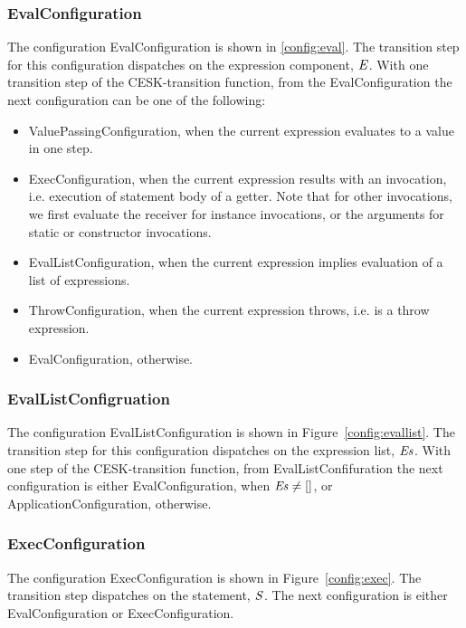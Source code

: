\documentclass[a4paper,oneside]{article}
\begin{document}
\subsubsection{EvalConfiguration}
\label{subsubsec:evalconfig}

The configuration EvalConfiguration is shown in \ref{config:eval}.
The transition step for this configuration dispatches on the expression component, $\mathit{E}$.
With one transition step of the CESK-transition function, from the EvalConfiguration the next configuration can be one of the following:

\begin{itemize}
    \item ValuePassingConfiguration, when the current expression evaluates to a value in one step.
    \item ExecConfiguration, when the current expression results with an invocation, i.e. execution of statement body of a getter.
        Note that for other invocations, we first evaluate the receiver for instance invocations, or the arguments for static or constructor invocations.
    \item EvalListConfiguration, when the current expression implies evaluation of a list of expressions.
    \item ThrowConfiguration, when the current expression throws, i.e. is a throw expression.
    \item EvalConfiguration, otherwise.
\end{itemize}


\subsubsection{EvalListConfigruation}
\label{subsubsec:evallistconfig}

The configuration EvalListConfiguration is shown in Figure~\ref{config:evallist}.
The transition step for this configuration dispatches on the expression list, $\mathit{E}\mathit{s}$.
With one step of the CESK-transition function, from EvalListConfifuration the next configuration is either EvalConfiguration, when $\mathit{E}\mathit{s} \neq []$, or ApplicationConfiguration, otherwise.


\subsubsection{ExecConfiguration}
\label{subsubsec:execconfig}

The configuration ExecConfiguration is shown in Figure~\ref{config:exec}.
The transition step dispatches on the statement, $\mathit{S}$.
The next configuration is either EvalConfiguration or ExecConfiguration.
\end{document}
